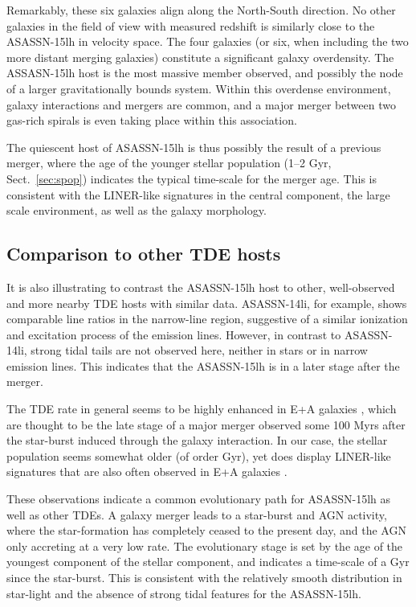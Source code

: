 \documentclass[traditabstract]{aa}
\begin{document}
Remarkably, these six galaxies align along the North-South direction. No other galaxies in the field of view with measured redshift is similarly close to the ASASSN-15lh in velocity space. The four galaxies (or six, when including the two more distant merging galaxies) constitute a significant galaxy overdensity. The ASSASN-15lh host is the most massive member observed, and possibly the node of a larger gravitationally bounds system. Within this overdense environment, galaxy interactions and mergers are common, and a major merger between two gas-rich spirals is even taking place within this association. 

The quiescent host of ASASSN-15lh is thus possibly the result of a previous merger, where the age of the younger stellar population (1--2 Gyr, Sect.~\ref{sec:spop}) indicates the typical time-scale for the merger age. This is consistent with the LINER-like signatures in the central component, the large scale environment, as well as the galaxy morphology.

\subsection{Comparison to other TDE hosts}

It is also illustrating to contrast the ASASSN-15lh host to other, well-observed and more nearby TDE hosts with similar data. ASASSN-14li, for example, shows comparable line ratios in the narrow-line region, suggestive of a similar ionization and excitation process of the emission lines. However, in contrast to ASASSN-14li, strong tidal tails are not observed here, neither in stars or in narrow emission lines. This indicates that the ASASSN-15lh is in a later stage after the merger.

The TDE rate in general seems to be highly enhanced in E+A galaxies \citep{2014ApJ...793...38A, 2016ApJ...818L..21F}, which are thought to be the late stage of a major merger observed some 100 Myrs after the star-burst induced through the galaxy interaction. In our case, the stellar population seems somewhat older (of order Gyr), yet does display LINER-like signatures that are also often observed in E+A galaxies \citep{2006ApJ...646L..33Y}.

These observations indicate a common evolutionary path for ASASSN-15lh as well as other TDEs. A galaxy merger leads to a star-burst and AGN activity, where the star-formation has completely ceased to the present day, and the AGN only accreting at a very low rate. The evolutionary stage is set by the age of the youngest component of the stellar component, and indicates a time-scale of a Gyr since the star-burst. This is consistent with the relatively smooth distribution in star-light and the absence of strong tidal features for the ASASSN-15lh.
\end{document}
